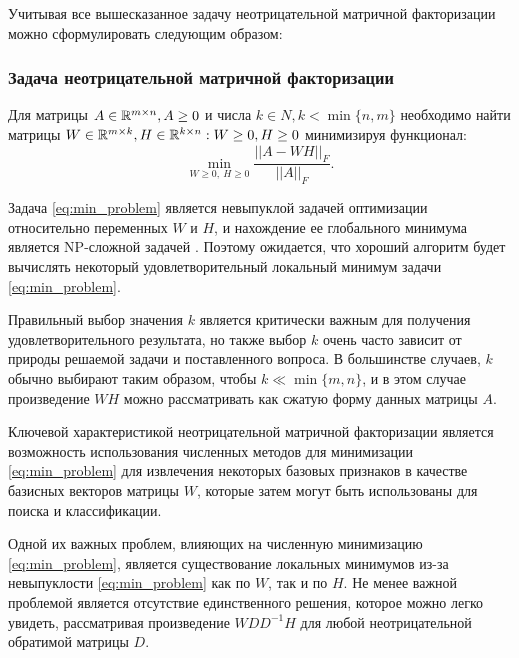 \newpage

Учитывая все вышесказанное задачу неотрицательной матричной факторизации можно сформулировать следующим образом:

\subsubsection{Задача неотрицательной матричной факторизации}

Для матрицы $A \in \mathbb{R}^{m \times n}, A \geq 0$ и числа $k \in N, k < \min\{n, m\}$
необходимо найти матрицы $W \in \mathbb{R}^{m \times k}, H \in \mathbb{R}^{k \times n} : W \geq 0, H \geq 0$ минимизируя функционал:
\begin{equation} \label{eq:min_problem}
  \min_{W \geq 0, \ H \geq 0} \dfrac{||A - WH||_F}{|| A ||_F}.
\end{equation}

Задача \eqref{eq:min_problem} является невыпуклой задачей оптимизации относительно переменных $W$ и $H$,
и нахождение ее глобального минимума является NP-сложной задачей \cite{vavaris}.
Поэтому ожидается, что хороший алгоритм будет вычислять некоторый удовлетворительный локальный минимум задачи \eqref{eq:min_problem}.

Правильный выбор значения $k$ является критически важным для получения удовлетворительного результата,
но также выбор $k$ очень часто зависит от природы решаемой задачи и поставленного вопроса.
В большинстве случаев, $k$ обычно выбирают таким образом, чтобы $k \ll \min\{m, n\}$,
и в этом случае произведение $WH$ можно рассматривать как сжатую форму данных матрицы $A$.

Ключевой характеристикой неотрицательной матричной факторизации является возможность
использования численных методов для минимизации \eqref{eq:min_problem}
для извлечения некоторых базовых признаков в качестве базисных векторов матрицы $W​$,
которые затем могут быть использованы для поиска и классификации.

Одной их важных проблем, влияющих на численную минимизацию \eqref{eq:min_problem},
является существование локальных минимумов
из-за невыпуклости \eqref{eq:min_problem} как по $W$, так и по $H$.
Не менее важной проблемой является отсутствие единственного решения,
которое можно легко увидеть, рассматривая произведение $WDD^{− 1}H$ для любой неотрицательной обратимой матрицы $D$.

